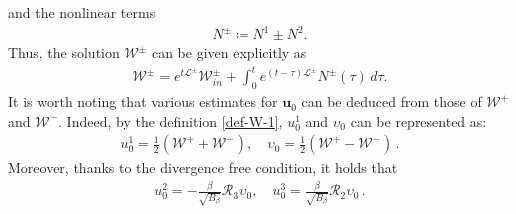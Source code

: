 \documentclass[11pt,reqno]{article}
\numberwithin{equation}{section}
\newcommand\W{{\mathcal W}}
\newcommand\up{\upsilon}
\newcommand\uu{\bm{u}}
\newcommand \tri {\coloneqq}
\let\f=\frac
\begin{document}
and the nonlinear terms 
\begin{align}\label{def-Npm}
N^{\pm}\tri N^1\pm  %
N^2.
\end{align}
Thus, the solution $\W^{\pm}$ can be given explicitly as
\begin{align}\label{est-Wpm}
\W^{\pm} = e^{t\mathcal{L}^{\pm}} \W^{\pm}_ {in}+\int_0^t e^{(t-\tau)\mathcal{L}^{\pm}} N^{\pm} (\tau)\, d\tau .
\end{align}
It is worth noting that various estimates for $\uu_0$ can be deduced from those of $\W^{+}$ and $\W^{-}$. Indeed, 
by the definition \eqref{def-W-1}, $u_0^1$ and $\up_0$ can be represented as:
\begin{align}\label{rep-u01-w01}
u_0^1 = \f12(\W^{+}+\W^{-}),
\quad
\up_0 = \f12(\W^{+}-\W^{-})\,.
\end{align}
Moreover, thanks to the divergence free condition,  it holds that
\begin{align}\label{rep-u023}
u_0^2=-{\f{\beta}{\sqrt{B_{\beta}}}} \mathcal{R}_3\up_0,
\quad
u_0^3=\f{\beta}{\sqrt{B_{\beta}}} \mathcal{R}_2\up_0\,.
\end{align}
\end{document}
